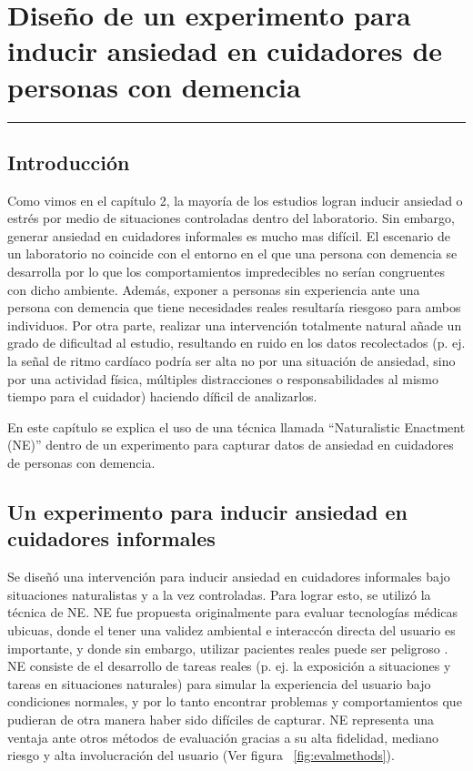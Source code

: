 \chapter{Dise\~no de un experimento para inducir ansiedad en cuidadores de personas con demencia}\label{capit:cap3}
\vspace{-2.0325ex}%
\noindent
\rule{\textwidth}{0.5pt}
\vspace{-5.5ex}%
\newcommand{\pushline}{\Indp}%
\section{Introducci\'on}\label{secc:introduction}

Como vimos en el cap\'itulo 2, la mayor\'ia de los estudios logran inducir ansiedad o estr\'es por medio de situaciones controladas dentro del laboratorio. Sin embargo, generar ansiedad en cuidadores informales es mucho mas dif\'icil. El escenario de un laboratorio no coincide con el entorno en el que una persona con demencia se desarrolla por lo que los comportamientos impredecibles no ser\'ian congruentes con dicho ambiente. Adem\'as, exponer a personas sin experiencia ante una persona con demencia que tiene necesidades reales resultar\'ia riesgoso para ambos individuos. Por otra parte, realizar una intervenci\'on totalmente natural a\~nade un grado de dificultad al estudio, resultando en ruido en los datos recolectados (p. ej. la se\~nal de ritmo card\'iaco podr\'ia ser alta no por una situaci\'on de ansiedad, sino por una actividad f\'isica, m\'ultiples distracciones o responsabilidades al mismo tiempo para el cuidador) haciendo d\'ificil de analizarlos.

En este cap\'itulo se explica el uso de una t\'ecnica llamada ``Naturalistic Enactment (NE)'' \citep{Castro11} dentro de un experimento para capturar datos de ansiedad en cuidadores de personas con demencia.


\section{Un experimento para inducir ansiedad en cuidadores informales}\label{secc:experiment}
Se dise\~n\'o una intervenci\'on para inducir ansiedad en cuidadores informales bajo situaciones naturalistas y a la vez controladas. Para lograr esto, se utiliz\'o la t\'ecnica de NE. NE fue propuesta originalmente para evaluar tecnolog\'ias m\'edicas ubicuas, donde el tener una validez ambiental e interacc\'on directa del usuario es importante, y donde sin embargo, utilizar pacientes reales puede ser peligroso \citep{Castro11}. NE consiste de el desarrollo de tareas reales (p. ej. la exposici\'on a situaciones y tareas en situaciones naturales) para simular la experiencia del usuario bajo condiciones normales, y por lo tanto encontrar problemas y comportamientos que pudieran de otra manera haber sido dif\'iciles de capturar. NE representa una ventaja ante otros m\'etodos de evaluaci\'on gracias a su alta fidelidad, mediano riesgo y alta involucraci\'on del usuario (Ver figura ~\ref{fig:evalmethods}).

